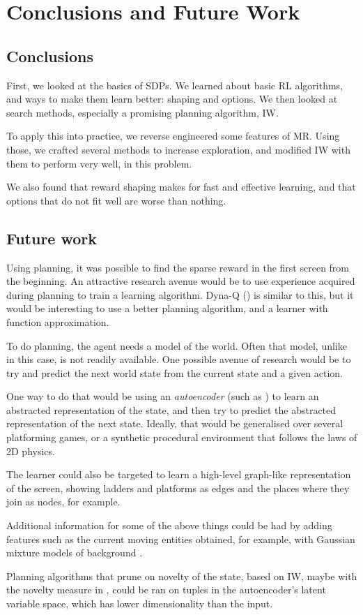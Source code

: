 \chapter{Conclusions and Future Work}
\section{Conclusions}
First, we looked at the basics of \aclp{SDP}. We learned about basic \acl{RL}
algorithms, and ways to make them learn better: shaping and options. We then
looked at search methods, especially a promising planning algorithm, \acl{IW}.

To apply this into practice, we reverse engineered some features of \acl{MR}.
Using those, we crafted several methods to increase exploration, and modified
\ac{IW} with them to perform very well, in this problem.

We also found that reward shaping makes for fast and effective learning, and
that options that do not fit well are worse than nothing.

\section{Future work}
Using planning, it was possible to find the sparse reward in the first screen
from the beginning. An attractive research avenue would be to use experience
acquired during planning to train a learning algorithm. Dyna-Q
(\cite[Section~9.2]{sutton1998introduction}) is similar to this, but it would be
interesting to use a better planning algorithm, and a learner with function approximation.

To do planning, the agent needs a model of the world. Often that model, unlike
in this case, is not readily available. One possible avenue of research would be
to try and predict the next world state from the current state and a given action.

One way to do that would be using an \emph{autoencoder} (such as
\cite{dumoulin2016adversarially}) to learn an abstracted representation of the
state, and then try to predict the abstracted representation of the next state.
Ideally, that would be generalised over several platforming games, or a
synthetic procedural environment that follows the laws of 2D physics.

The learner could also be targeted to learn a high-level graph-like
representation of the screen, showing ladders and platforms as edges and the
places where they join as nodes, for example.

Additional information for some of the above things could be had by adding
features such as the current moving entities obtained, for example, with
Gaussian mixture models of background \citep{stauffer1999adaptive}.

Planning algorithms that prune on novelty of the state, based on \acl{IW}, maybe
with the novelty measure in \citet{bellemare2016unifying}, could be ran on
tuples in the autoencoder's latent variable space, which has lower
dimensionality than the input.

